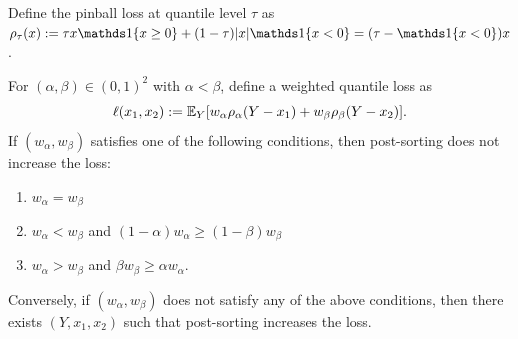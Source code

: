 

Define the pinball loss at quantile level $\tau$ as $\rho_\tau(x) := \tau x\indi{x \geq 0} +(1-\tau)|x|\indi{x < 0} = (\tau - \indi{x < 0})x$.
\begin{prop}
For $(\alpha, \beta) \in (0, 1)^2$ with $\alpha < \beta$, define a weighted quantile loss as
\[
\ell(x_1, x_2) := \mathbb{E}_Y [w_\alpha \rho_\alpha (Y-x_1) + w_\beta \rho_\beta (Y-x_2)].
\]
If $(w_\alpha, w_\beta)$ satisfies one of the following conditions, then post-sorting does not increase the loss:
\begin{enumerate}
  \item $w_\alpha = w_\beta$
  \item $w_\alpha < w_\beta$ and $(1-\alpha)w_\alpha \geq (1-\beta)w_\beta$
  \item $w_\alpha > w_\beta$ and $\beta w_\beta \geq \alpha w_\alpha$.
\end{enumerate}
Conversely, if $(w_\alpha, w_\beta)$ does not satisfy any of the above conditions, then there exists $(Y, x_1, x_2)$ such that post-sorting increases the loss.
\end{prop}

